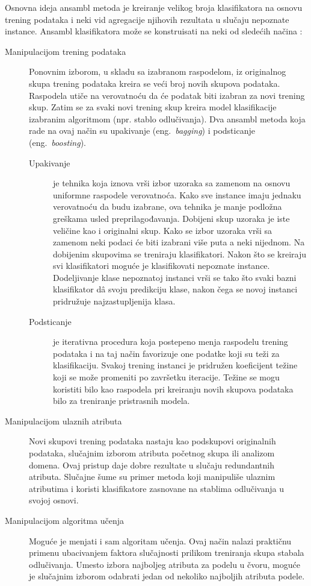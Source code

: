 \documentclass[12pt,oneside]{memoir}
\begin{document}
Osnovna ideja ansambl metoda je kreiranje velikog broja klasifikatora na osnovu trening podataka i neki vid agregacije njihovih rezultata u slučaju nepoznate instance. Ansambl klasifikatora može se konstruisati na neki od sledećih načina \cite{mitic}:
\begin{description}
\item[Manipulacijom trening podataka] Ponovnim izborom, u skladu sa izabranom raspodelom, iz originalnog skupa trening podataka kreira se veći broj novih skupova podataka. Raspodela utiče na verovatnoću da će podatak biti izabran za novi trening skup. Zatim se za svaki novi trening skup kreira model klasifikacije izabranim algoritmom (npr. stablo odlučivanja). Dva ansambl metoda koja rade na ovaj način su upakivanje (eng.~\textit{bagging}) i podsticanje (eng.~\textit{boosting}).
\begin{description}
\item[Upakivanje] je tehnika koja iznova vrši izbor uzoraka sa zamenom na osnovu uniformne raspodele verovatnoća. Kako sve instance imaju jednaku verovatnoću da budu izabrane, ova tehnika je manje podložna greškama usled preprilagođavanja. Dobijeni skup uzoraka je iste veličine kao i originalni skup. Kako se izbor uzoraka vrši sa zamenom neki podaci će biti izabrani više puta a neki nijednom. Na dobijenim skupovima se treniraju klasifikatori. Nakon što se kreiraju svi klasifikatori moguće je klasifikovati nepoznate instance. Dodeljivanje klase nepoznatoj instanci vrši se tako što svaki bazni klasifikator d\^a svoju predikciju klase, nakon čega se novoj instanci pridružuje najzastupljenija klasa.
\item[Podsticanje] je iterativna procedura koja postepeno menja raspodelu trening podataka i na taj način favorizuje one podatke koji su teži za klasifikaciju. Svakoj trening instanci je pridružen koeficijent težine koji se može promeniti po završetku iteracije. Težine se mogu koristiti bilo kao raspodela pri kreiranju novih skupova podataka bilo za treniranje pristrasnih modela.
\end{description}
\item[Manipulacijom ulaznih atributa] Novi skupovi trening podataka nastaju kao podskupovi originalnih podataka, slučajnim izborom atributa početnog skupa ili analizom domena. Ovaj pristup daje dobre rezultate u slučaju redundantnih atributa. Slučajne šume su primer metoda koji manipuliše ulaznim atributima i koristi klasifikatore zasnovane na stablima odlučivanja u svojoj osnovi. 
\item[Manipulacijom algoritma učenja] Moguće je menjati i sam algoritam učenja. Ovaj način nalazi praktičnu primenu ubacivanjem faktora slučajnosti prilikom treniranja skupa stabala odlučivanja. Umesto izbora najboljeg atributa za podelu u čvoru, moguće je slučajnim izborom odabrati jedan od nekoliko najboljih atributa podele.

\end{description}
\end{document}

